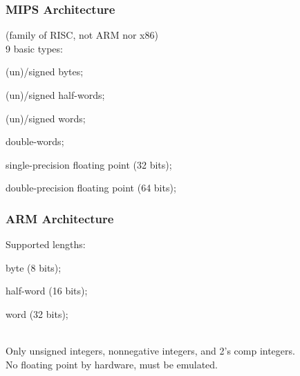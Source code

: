 \subsubsection*{MIPS Architecture}
(family of RISC, not ARM nor x86)\\
9 basic types: \begin{enuminline}
    \item (un)/signed bytes;
    \item (un)/signed half-words;
    \item (un)/signed words;
    \item double-words;
    \item single-precision floating point (32 bits);
    \item double-precision floating point (64 bits);
\end{enuminline}

\subsubsection*{ARM Architecture}
Supported lengths: \begin{enuminline}
    \item byte (8 bits);
    \item half-word (16 bits);
    \item word (32 bits);
\end{enuminline}\\
Only unsigned integers, nonnegative integers, and 2's comp integers.\\
No floating point by hardware, must be emulated.